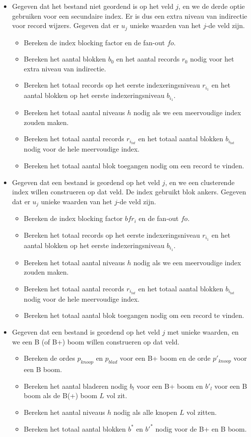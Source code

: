 \documentclass[indexstructuren.tex]{subfiles}
\begin{document}
\begin{itemize}
\begin{itemize}
\item 
Gegeven dat het bestand niet geordend is op het veld $j$, en we de derde optie gebruiken voor een secundaire index. Er is dus een extra niveau van indirectie voor record wijzers. Gegeven dat er $u_j$ unieke waarden van het $j$-de veld zijn.
\begin{itemize}
\item Bereken de index blocking factor en de fan-out $fo$.
\item Bereken het aantal blokken $b_0$ en het aantal records $r_0$ nodig voor het extra niveau van indirectie.
\item Bereken het totaal records op het eerste indexeringsniveau $r_{i_1}$ en het aantal blokken op het eerste indexeringsniveau $b_{i_1}$.
\item Bereken het totaal aantal niveaus $h$ nodig als we een meervoudige index zouden maken. 
\item Bereken het totaal aantal records $r_{i_{tot}}$ en het totaal aantal blokken $b_{i_{tot}}$ nodig voor de hele meervoudige index.
\item Bereken het totaal aantal blok toegangen nodig om een record te vinden.
\end{itemize}

\item
Gegeven dat een bestand is geordend op het veld $j$, en we een clusterende index willen construeren op dat veld. De index gebruikt blok ankers. Gegeven dat er $u_j$ unieke waarden van het $j$-de veld zijn.
\begin{itemize}
\item Bereken de index blocking factor $bfr_i$ en de fan-out $fo$.
\item Bereken het totaal records op het eerste indexeringsniveau $r_{i_1}$ en het aantal blokken op het eerste indexeringsniveau $b_{i_1}$.
\item Bereken het totaal aantal niveaus $h$ nodig als we een meervoudige index zouden maken. 
\item Bereken het totaal aantal records $r_{i_{tot}}$ en het totaal aantal blokken $b_{i_{tot}}$ nodig voor de hele meervoudige index.
\item Bereken het totaal aantal blok toegangen nodig om een record te vinden.
\end{itemize}

\item
Gegeven dat een bestand is geordend op het veld $j$ met unieke waarden, en we een B (of B+) boom willen construeren op dat veld.
\begin{itemize}
\item Bereken de ordes $p_{knoop}$ en $p_{blad}$ voor een B+ boom en de orde $p'_{knoop}$ voor een B boom.
\item Bereken het aantal bladeren nodig $b_l$ voor een B+ boom en $b'_l$ voor een B boom als de B(+) boom $L$ vol zit.
\item Bereken het aantal niveaus $h$ nodig als alle knopen $L$ vol zitten.
\item Bereken het totaal aantal blokken $b^{*}$ en $b'^{*}$ nodig voor de B+ en B boom.
\end{itemize}


\end{itemize}
\end{itemize}
\end{document}
